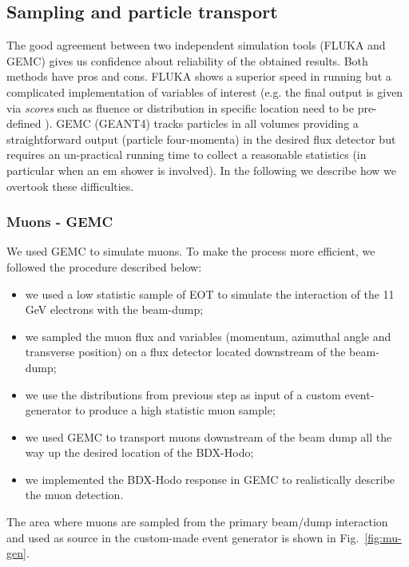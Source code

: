 \subsection{Sampling  and particle transport}\label{sec:sampling}
The good agreement between two independent simulation tools (FLUKA and GEMC)  gives us confidence about reliability of the obtained results. Both methods have pros and cons. FLUKA shows a superior speed in running but a complicated implementation of  variables of interest  (e.g. the final output is given via {\it scores} such as fluence or distribution in specific location  need to be pre-defined ). GEMC (GEANT4) tracks particles in all volumes providing a straightforward  output (particle four-momenta) in the desired flux detector but requires an un-practical running time to collect a reasonable statistics (in particular when an em shower is involved). In the following we describe how we overtook these difficulties.

\subsubsection{Muons - GEMC}\label{sec:gmc-mu}
We used GEMC to simulate muons. To make the  process more efficient, we followed the   procedure described below: 
\begin{itemize}
\item  we used a low statistic sample of EOT to simulate the interaction of the 11 GeV electrons with the beam-dump;
\item  we sampled the muon flux and variables (momentum, azimuthal angle and transverse position)  on a flux detector located downstream of the beam-dump;
\item we use the distributions from previous step as input of a custom event-generator to produce a high statistic muon sample;
\item we used GEMC to transport muons  downstream of the beam dump all the way up the desired location of the BDX-Hodo;
\item  we implemented  the  BDX-Hodo response in GEMC to realistically describe the muon detection.
\end{itemize}
The area where  muons are sampled from the primary beam/dump interaction and used  as source in the custom-made event generator is shown in Fig.~\ref{fig:mu-gen}.

